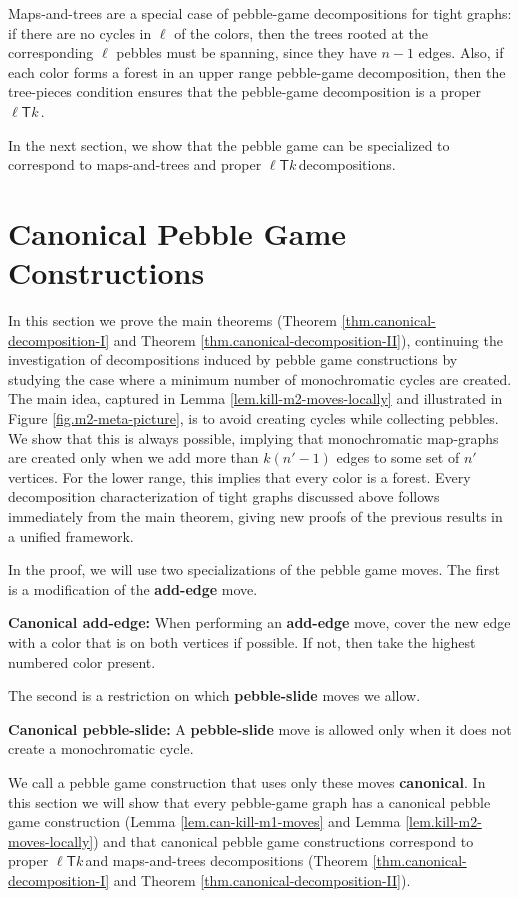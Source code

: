 \documentclass[Svgc,nospthms]{Svgc}
\newcommand{\ellteekay}{\ensuremath{\ell{\mathsf T}k}\,}
\newcommand{\reffig}[1]{Figure \ref{fig.#1}}
\newcommand{\reflem}[1]{Lemma \ref{lem.#1}}
\newcommand{\refthm}[1]{Theorem \ref{thm.#1}}
\begin{document}
Maps-and-trees are a special case of pebble-game decompositions for tight graphs:
if there are no cycles in $\ell$ of the colors, then the trees rooted at the 
corresponding $\ell$ pebbles must be spanning, since they have $n-1$ edges.
Also, if each color forms a forest in an upper range pebble-game decomposition, then
the tree-pieces condition ensures that the pebble-game decomposition is a proper
$\ellteekay$.

In the next section, we show that the pebble game can be specialized to correspond
to maps-and-trees and proper \ellteekay decompositions.


\section{Canonical Pebble Game Constructions}
In this section we prove the main theorems  (\refthm{canonical-decomposition-I} and \refthm{canonical-decomposition-II}), continuing the investigation of decompositions 
induced by pebble game constructions by studying the 
case where a minimum number of monochromatic cycles are created.  
The main idea, captured in \reflem{kill-m2-moves-locally} and illustrated in 
\reffig{m2-meta-picture}, is to avoid creating cycles while collecting pebbles.  We 
show that this is always possible, implying that monochromatic map-graphs are 
created only when we add more than $k(n'-1)$ edges to some set of $n'$ vertices.  For the lower
range, this implies that every color is a forest.
Every decomposition characterization of tight graphs discussed above follows immediately from
the main theorem, giving new proofs of the previous results in a unified framework.



In the proof, we will use two specializations of the pebble game moves.  
The first is a modification of the {\bf add-edge} move.

{\bf Canonical add-edge:} When performing an {\bf add-edge} move, cover the new edge with 
a color that is on both vertices if possible.  If not, then take the highest 
numbered color present.

The second is a restriction on which {\bf pebble-slide} moves we allow.

{\bf Canonical pebble-slide:} A {\bf pebble-slide} move is allowed only when it does
not create a monochromatic cycle.

We call a pebble game construction that uses only these moves {\bf canonical}.  In this section
we will show that every pebble-game graph has a canonical pebble game construction 
(\reflem{can-kill-m1-moves} and \reflem{kill-m2-moves-locally}) and that canonical 
pebble game constructions correspond to proper \ellteekay and maps-and-trees decompositions
(\refthm{canonical-decomposition-I} and \refthm{canonical-decomposition-II}).
\end{document}

